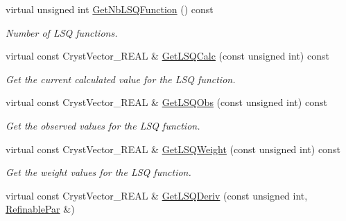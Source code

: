 \begin{DoxyCompactItemize}
\item 
\mbox{\label{class_obj_cryst_1_1_refinable_obj_a56ebc023d04e9f38f62c9666b8b89549}} 
virtual unsigned int \mbox{\hyperlink{class_obj_cryst_1_1_refinable_obj_a56ebc023d04e9f38f62c9666b8b89549}{Get\+Nb\+L\+S\+Q\+Function}} () const
\begin{DoxyCompactList}\small\item\em Number of L\+SQ functions. \end{DoxyCompactList}\item 
\mbox{\label{class_obj_cryst_1_1_refinable_obj_af25ddee90d0ef056332f9a922e536653}} 
virtual const Cryst\+Vector\+\_\+\+R\+E\+AL \& \mbox{\hyperlink{class_obj_cryst_1_1_refinable_obj_af25ddee90d0ef056332f9a922e536653}{Get\+L\+S\+Q\+Calc}} (const unsigned int) const
\begin{DoxyCompactList}\small\item\em Get the current calculated value for the L\+SQ function. \end{DoxyCompactList}\item 
\mbox{\label{class_obj_cryst_1_1_refinable_obj_ab08f7a875cc558baf78a8b55768626cb}} 
virtual const Cryst\+Vector\+\_\+\+R\+E\+AL \& \mbox{\hyperlink{class_obj_cryst_1_1_refinable_obj_ab08f7a875cc558baf78a8b55768626cb}{Get\+L\+S\+Q\+Obs}} (const unsigned int) const
\begin{DoxyCompactList}\small\item\em Get the observed values for the L\+SQ function. \end{DoxyCompactList}\item 
\mbox{\label{class_obj_cryst_1_1_refinable_obj_aa561e549e0196e2542c94fcfb536eeb3}} 
virtual const Cryst\+Vector\+\_\+\+R\+E\+AL \& \mbox{\hyperlink{class_obj_cryst_1_1_refinable_obj_aa561e549e0196e2542c94fcfb536eeb3}{Get\+L\+S\+Q\+Weight}} (const unsigned int) const
\begin{DoxyCompactList}\small\item\em Get the weight values for the L\+SQ function. \end{DoxyCompactList}\item 
virtual const Cryst\+Vector\+\_\+\+R\+E\+AL \& \mbox{\hyperlink{class_obj_cryst_1_1_refinable_obj_a1946baf8a64267d50ffe6a79b96f4add}{Get\+L\+S\+Q\+Deriv}} (const unsigned int, \mbox{\hyperlink{class_obj_cryst_1_1_refinable_par}{Refinable\+Par}} \&)

\end{DoxyCompactItemize}
